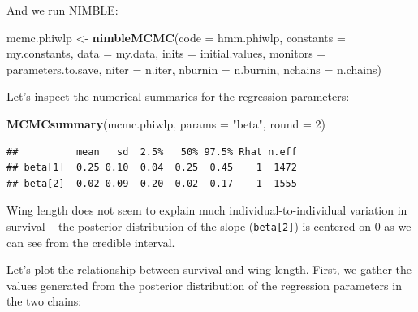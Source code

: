 \documentclass[
  12pt,
]{krantz}
\newenvironment{Shaded}{\begin{snugshade}}{\end{snugshade}}
\newcommand{\AttributeTok}[1]{\textcolor[rgb]{0.13,0.29,0.53}{#1}}
\newcommand{\CommentTok}[1]{\textcolor[rgb]{0.56,0.35,0.01}{\textit{#1}}}
\newcommand{\DecValTok}[1]{\textcolor[rgb]{0.00,0.00,0.81}{#1}}
\newcommand{\FunctionTok}[1]{\textcolor[rgb]{0.13,0.29,0.53}{\textbf{#1}}}
\newcommand{\NormalTok}[1]{#1}
\newcommand{\OtherTok}[1]{\textcolor[rgb]{0.56,0.35,0.01}{#1}}
\newcommand{\SpecialCharTok}[1]{\textcolor[rgb]{0.81,0.36,0.00}{\textbf{#1}}}
\newcommand{\StringTok}[1]{\textcolor[rgb]{0.31,0.60,0.02}{#1}}
\begin{document}
And we run NIMBLE:

\begin{Shaded}
\begin{Highlighting}[]
\NormalTok{mcmc.phiwlp }\OtherTok{\textless{}{-}} \FunctionTok{nimbleMCMC}\NormalTok{(}\AttributeTok{code =}\NormalTok{ hmm.phiwlp, }
                          \AttributeTok{constants =}\NormalTok{ my.constants,}
                          \AttributeTok{data =}\NormalTok{ my.data,              }
                          \AttributeTok{inits =}\NormalTok{ initial.values,}
                          \AttributeTok{monitors =}\NormalTok{ parameters.to.save,}
                          \AttributeTok{niter =}\NormalTok{ n.iter,}
                          \AttributeTok{nburnin =}\NormalTok{ n.burnin, }
                          \AttributeTok{nchains =}\NormalTok{ n.chains)}
\end{Highlighting}
\end{Shaded}

Let's inspect the numerical summaries for the regression parameters:

\begin{Shaded}
\begin{Highlighting}[]
\FunctionTok{MCMCsummary}\NormalTok{(mcmc.phiwlp, }\AttributeTok{params =} \StringTok{"beta"}\NormalTok{, }\AttributeTok{round =} \DecValTok{2}\NormalTok{)}
\end{Highlighting}
\end{Shaded}

\begin{verbatim}
##          mean   sd  2.5%   50% 97.5% Rhat n.eff
## beta[1]  0.25 0.10  0.04  0.25  0.45    1  1472
## beta[2] -0.02 0.09 -0.20 -0.02  0.17    1  1555
\end{verbatim}

Wing length does not seem to explain much individual-to-individual variation in survival -- the posterior distribution of the slope (\texttt{beta{[}2{]}}) is centered on 0 as we can see from the credible interval.

Let's plot the relationship between survival and wing length. First, we gather the values generated from the posterior distribution of the regression parameters in the two chains:

\begin{Shaded}
\end{Shaded}
\end{document}
